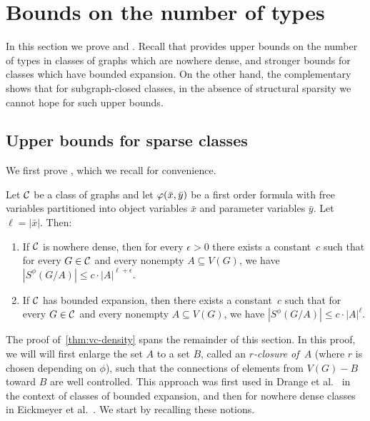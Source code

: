 \section{Bounds on the number of types}\label{sec:types}

In this section we prove  and .
	Recall that  provides upper bounds on the number of types in classes of graphs which are nowhere dense, 
	and stronger bounds for classes which have bounded expansion. 
	On the other hand, the complementary  shows that for subgraph-closed classes, in the absence of structural sparsity we cannot hope for such upper bounds.

\subsection{Upper bounds for sparse classes}
We first prove , which we recall for convenience.

\setcounter{aux}{\thetheorem}
\setcounter{theorem}{\thevcupper}
\begin{theorem}\label{thm:vc-density-recall}
Let $\mathcal{C}$ be a class of graphs and let $\varphi(\bar{x},\bar{y})$ be a first order formula
with free variables  partitioned  into object variables $\bar x$  and parameter variables $\bar y$. Let $\ell=|\bar x|$. Then:
\begin{enumerate}[(1)]
\item If $\mathcal{C}$ is nowhere dense, then for every $\epsilon>0$ 
there exists a constant~$c$ such that for every $G\in \mathcal{C}$ and every nonempty
$A\subseteq V(G)$, we have $|S^\phi(G/A)|\leq c\cdot |A|^{\ell+\epsilon}.$
\item If $\mathcal{C}$ has bounded expansion, then there exists a constant~$c$ such that for every $G\in \mathcal{C}$ and every nonempty $A\subseteq V(G)$, we have $|S^\phi(G/A)|\leq c\cdot |A|^\ell$.
\end{enumerate}
\end{theorem} 

The proof of~\cref{thm:vc-density} spans the remainder of this section.
In this proof, we will
will first enlarge the set $A$ to a set $B$, called
an \emph{$r$-closure of~$A$} (where $r$ is chosen depending on $\phi$), such 
that the connections of elements from $V(G)-B$ 
toward $B$ are well controlled. This approach
was first used in Drange et al.~\cite{drange2016kernelization} in the context of classes of bounded expansion, 
and then for nowhere dense classes in Eickmeyer et al.~\cite{eickmeyer2016neighborhood}. 
We start by recalling these notions.


